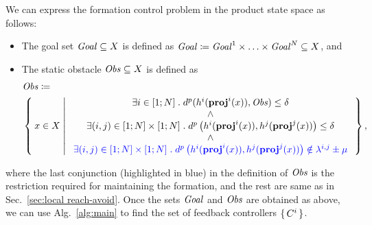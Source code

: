 We can express the formation control problem in the product state space as follows:
\begin{itemize}
	\item The goal set $\mathit{Goal}\subseteq X$ is defined as $\mathit{Goal} \coloneqq \mathit{Goal}^1\times \ldots \times \mathit{Goal}^N \subseteq X$, and
	\item The static obstacle $\mathit{Obs}\subseteq X$ is defined as 
		\begin{align}
			&\mathit{Obs} \coloneqq\\ 
				&\Set{ x\in X | 
					\begin{array}{c}
						\exists i\in [1;N]\;.\; d^{p}(h^i(\mathbf{proj}^i(x)),\mathit{Obs}) \leq \delta\\
						\wedge\\
						 \exists (i,j)\in [1;N]\times [1;N]\;.\; d^{p}\left(h^i(\mathbf{proj}^i(x)),h^j(\mathbf{proj}^j(x))\right)\leq\delta\\
						 \wedge\\
						  {\color{blue}\exists (i,j)\in [1;N]\times [1;N]\;.\; d^{p}\left(h^i(\mathbf{proj}^i(x)),h^j(\mathbf{proj}^j(x))\right)\notin\lambda^{i,j}\pm \mu}
					\end{array}},
		\end{align}
\end{itemize}
where the last conjunction (highlighted in blue) in the definition of $\mathit{Obs}$ is the restriction required for maintaining the formation, and the rest are same as in Sec.~\ref{sec:local reach-avoid}.
Once the sets $\mathit{Goal}$ and $\mathit{Obs}$ are obtained as above, we can use Alg.~\ref{alg:main} to find the set of feedback controllers $\set{C^i}$.


%




